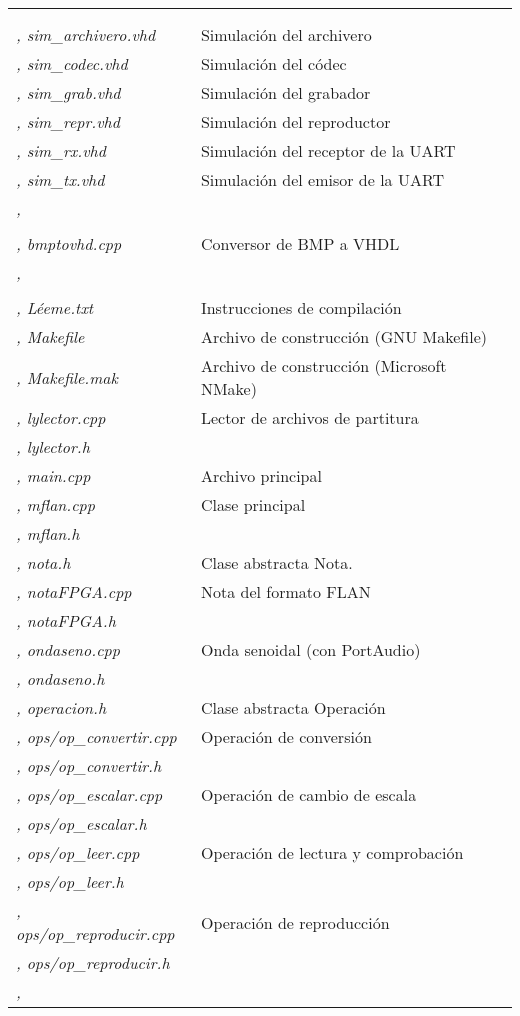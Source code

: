 \documentclass{article}
\begin{document}
\vspace*{-3em}

\begin{tabu}{| >{\itshape}X[3, l] | X[5, l] |}
	 \\
	 \\ \sep
	sim\_archivero.vhd & Simulación del archivero \\ \sep
	sim\_codec.vhd & Simulación del códec \\ \sep
	sim\_grab.vhd & Simulación del grabador \\ \sep
	sim\_repr.vhd & Simulación del reproductor \\ \sep
	sim\_rx.vhd & Simulación del receptor de la UART \\ \sep
	sim\_tx.vhd & Simulación del emisor de la UART \\ \sep

	 \\
	 \\ \sep
	bmptovhd.cpp & Conversor de BMP a VHDL \\ \sep

	 \\
	 \\ \sep
	Léeme.txt & Instrucciones de compilación \\ \sep
	Makefile & Archivo de construcción (GNU Makefile) \\ \sep
	Makefile.mak & Archivo de construcción (Microsoft NMake) \\ \sep
	lylector.cpp & Lector de archivos de partitura \\ \sep
	lylector.h & \\ \sep
	main.cpp & Archivo principal \\ \sep
	mflan.cpp & Clase principal \\ \sep
	mflan.h & \\ \sep
	nota.h & Clase abstracta Nota. \\ \sep
	notaFPGA.cpp & Nota del formato FLAN \\ \sep
	notaFPGA.h & \\ \sep
	ondaseno.cpp & Onda senoidal (con PortAudio) \\ \sep
	ondaseno.h & \\ \sep
	operacion.h & Clase abstracta Operación \\ \sep
	ops/op\_convertir.cpp & Operación de conversión \\ \sep
	ops/op\_convertir.h & \\ \sep
	ops/op\_escalar.cpp & Operación de cambio de escala \\ \sep
	ops/op\_escalar.h & \\ \sep
	ops/op\_leer.cpp & Operación de lectura y comprobación \\ \sep
	ops/op\_leer.h & \\ \sep
	ops/op\_reproducir.cpp & Operación de reproducción \\ \sep
	ops/op\_reproducir.h & \\ \sep
\end{tabu}
\end{document}
